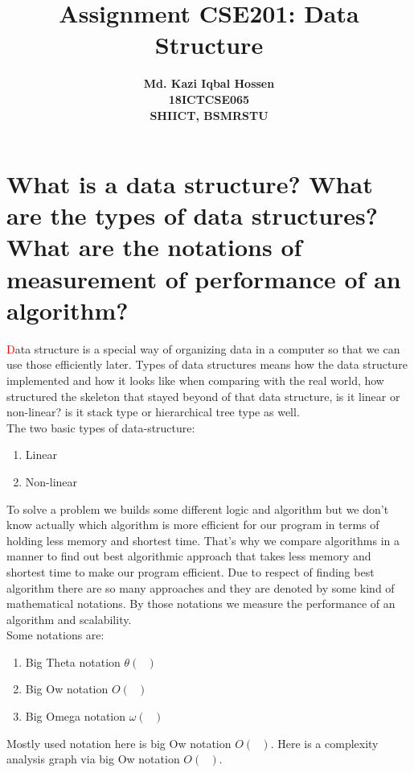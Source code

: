 \documentclass[11 pt]{article}
\title{Assignment CSE201: Data Structure}
\author{\textbf{Md. Kazi Iqbal Hossen}\\\textbf{18ICTCSE065}\\\textbf{SHIICT, BSMRSTU}}
\begin{document}
\pagecolor{LightSlateGray}

\pagecolor{white}
\tableofcontents
\pagebreak

\section{What is a data structure? What are the types of data structures? What are the notations of measurement of performance of an algorithm?}
\justify
{
{\huge\textcolor{red}{\hspace{5 mm}D}}ata structure is a special way of organizing data in a computer so that we can use those efficiently later. Types of data structures means how the data structure implemented and how it looks like when comparing with the real world, how structured the skeleton that stayed beyond of that data structure, is it linear or non-linear? is it stack type or hierarchical tree type as well.\\
The two basic types of data-structure:
\begin{enumerate}
	\item Linear
	\item Non-linear
\end{enumerate}
To solve a problem we builds some different logic and algorithm but we don't know actually which algorithm is more efficient for our program in terms of holding less memory and shortest time. That's why we compare algorithms in a manner to find out best algorithmic approach that takes less memory and shortest time to make our program efficient. Due to respect of finding best algorithm there are so many approaches and they are denoted by some kind of mathematical notations. By those notations we measure the performance of an algorithm and scalability.\\
Some notations are:
\begin{enumerate}
	\item Big Theta notation $\theta(\textrm{ })$
	\item Big Ow notation $O(\textrm{ })$
	\item Big Omega notation $\omega(\textrm{ })$
\end{enumerate}
Mostly used notation here is big Ow notation $O(\textrm{ })$. Here is a complexity analysis graph via big Ow notation $O(\textrm{ })$.
}
\end{document}
